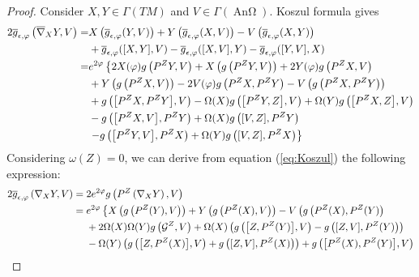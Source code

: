 \documentclass[12pt]{article}
\DeclareMathOperator{\An}{\text{An}\Omega}
\begin{document}
\begin{proof} 
    Consider $X,Y\in \Gamma(TM)$ and $V\in \Gamma(\An)$. Koszul formula \cite[Th. 11]{ONeill1983} gives
    \begin{equation}\label{eq:lem Koszul}
    \footnotesize
    \begin{aligned}
    2 \overline{g}_{\epsilon, \varphi}\left(\overline{\nabla}_X Y, V\right)= & X\left(\overline{g}_{\epsilon, \varphi}(Y, V)\right)+Y\left(\overline{g}_{\epsilon, \varphi}(X, V)\right)-V\left(\overline{g}_{\epsilon, \varphi}(X, Y)\right) \\
    & +\overline{g}_{\epsilon, \varphi}([X, Y], V)-\overline{g}_{\epsilon, \varphi}([X, V], Y)-\overline{g}_{\epsilon, \varphi}([Y, V], X) \\
    = & e^{2 \varphi}\left\{2 X(\varphi) g\left(P^Z Y, V\right)+X\left(g\left(P^Z Y, V\right)\right)+2 Y(\varphi) g\left(P^Z X, V\right)\right. \\
    & +Y\left(g\left(P^Z X, V\right)\right)-2 V(\varphi) g\left(P^Z X, P^Z Y\right)-V\left(g\left(P^Z X, P^Z Y\right)\right) \\
    & +g\left(\big[P^Z X, P^Z Y\big], V\right)-\Omega(X) g\left(\big[P^Z Y, Z\big], V\right)+\Omega(Y) g\left(\big[P^Z X, Z\big], V\right) \\
    & -g\left(\big[P^Z X, V\big], P^Z Y\right)+\Omega(X) g\left([V, Z], P^Z Y\right) \\
    & \left.-g\left(\big[P^Z Y, V\big], P^Z X\right)+\Omega(Y) g\left([V, Z], P^Z X\right)\right\}
    \end{aligned}
    \end{equation}
    Considering $\omega(Z)=0$, we can derive from equation (\ref{eq:Koszul}) the following expression:
    \begin{equation}\label{eq:lem Koszul Gal}
    \footnotesize
    \begin{aligned}
    2 \overline{g}_{\epsilon, \varphi}\left(\nabla_X Y, V\right) ={}& 2 e^{2 \varphi} g\left(P^Z\left(\nabla_X Y\right), V\right) \\
    ={}& e^{2 \varphi}\left\{X\left(g\left(P^Z(Y), V\right)\right)+Y\left(g\left(P^Z(X), V\right)\right)-V\left(g\left(P^Z(X), P^Z(Y)\right)\right.\right. \\
    & +2 \Omega(X) \Omega(Y) g\left(\mathcal{G}^Z, V\right) +\Omega(X)\left(g\left(\big[Z, P^Z(Y)\big], V\right)-g\left([Z, V], P^Z(Y)\right)\right) \\
    & -\Omega(Y)\left(g\left(\big[Z, P^Z(X)\big], V\right)+g\left([Z, V], P^Z(X)\right)\right)  +g\left(\big[P^Z(X), P^Z(Y)\big], V\right)\\ 

\end{aligned}
\end{equation}
\end{proof}
\end{document}
